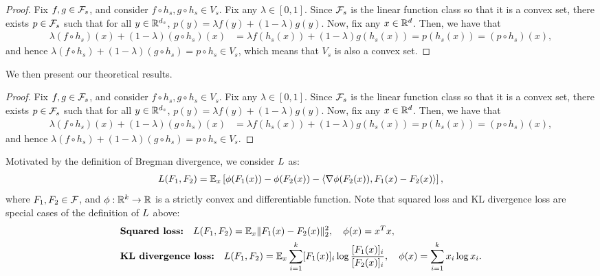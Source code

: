 \begin{proof}
Fix $f, g \in \mathcal{F}_s$, and consider $f \circ h_s, g \circ h_s \in V_s$. Fix any $\lambda \in [0,1]$. Since $\mathcal{F}_s$ is the linear function class so that it is a convex set, there exists $p \in \mathcal{F}_s$ such that for all $y \in \mathbb{R}^{d_s}$, $p(y) = \lambda f(y) + (1-\lambda)g(y)$. Now, fix any $x \in \mathbb{R}^d$. Then, we have that
\begin{align*}
    \lambda (f \circ h_s)(x) + (1-\lambda)(g \circ h_s)(x) &= \lambda f(h_s(x)) + (1-\lambda)g(h_s(x))
    = p(h_s(x)) = (p \circ h_s)(x),
\end{align*}
and hence $\lambda (f \circ h_s) + (1-\lambda)(g \circ h_s) = p \circ h_s \in V_s$, which means that $V_s$ is also a convex set.
\end{proof}


We then present our theoretical results. 

\begin{proof}
    Fix $f, g \in \mathcal{F}_s$, and consider $f \circ h_s, g \circ h_s \in V_s$. Fix any $\lambda \in [0,1]$. Since $\mathcal{F}_s$ is the linear function class so that it is a convex set, there exists $p \in \mathcal{F}_s$ such that for all $y \in \mathbb{R}^{d_s}$, $p(y) = \lambda f(y) + (1-\lambda)g(y)$. Now, fix any $x \in \mathbb{R}^d$. Then, we have that
    \begin{align*}
        \lambda (f \circ h_s)(x) + (1-\lambda)(g \circ h_s)(x) &= \lambda f(h_s(x)) + (1-\lambda)g(h_s(x))
        = p(h_s(x)) = (p \circ h_s)(x),
    \end{align*}
    and hence $\lambda (f \circ h_s) + (1-\lambda)(g \circ h_s) = p \circ h_s \in V_s$.
\end{proof}

Motivated by the definition of Bregman divergence, we consider $L$ as:
\begin{align}
    L(F_1, F_2) = \mathbb{E}_x \left[ \phi(F_1(x))-\phi(F_2(x)) - \left \langle \nabla \phi(F_2(x)), F_1(x)-F_2(x) \right \rangle \right],
\end{align}
where $F_1, F_2 \in \mathcal{F}$, and $\phi: \mathbb{R}^k \to \mathbb{R}$ is a strictly convex and differentiable function.
Note that squared loss and KL divergence loss are special cases of the definition of $L$ above:
\begin{align*}
    & \textbf{Squared loss:} \quad L(F_1, F_2)=\mathbb{E}_x\|F_1(x)-F_2(x) \|_2^2, \quad \phi(x)=x^Tx, \\
    & \textbf{KL divergence loss:} \quad L(F_1, F_2)= \mathbb{E}_x \sum_{i=1}^k [F_1(x)]_i \log \frac{[F_1(x)]_i}{[F_2(x)]_i}, \quad \phi(x)=\sum_{i=1}^k x_i \log x_i.
\end{align*}


